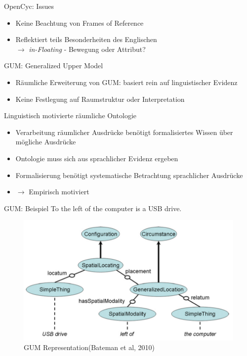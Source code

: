 \documentclass[12pt,a4paper]{beamer}
\begin{document}
\begin{frame}{OpenCyc: Issues}
\begin{itemize}
\item Keine Beachtung von Frames of Reference
\item Reflektiert teils Besonderheiten des Englischen\\
$\to$ \textit{in-Floating} - Bewegung oder Attribut?
\end{itemize}
\end{frame}



\begin{frame}{GUM: Generalized Upper Model}
\begin{itemize}
\item Räumliche Erweiterung von GUM: basiert rein auf linguistischer Evidenz
\item Keine Festlegung auf Raumstruktur oder Interpretation
\end{itemize}
\end{frame}

\begin{frame}{Linguistisch motivierte räumliche Ontologie}
\begin{itemize}
\item Verarbeitung räumlicher Ausdrücke benötigt formalisiertes Wissen über mögliche Ausdrücke
\item Ontologie muss sich aus sprachlicher Evidenz ergeben
\item Formalisierung benötigt systematische Betrachtung sprachlicher Ausdrücke
\item $\to$ Empirisch motiviert
\end{itemize}
\end{frame}



\begin{frame}{GUM: Beispiel}
To the left of the computer is a USB drive.

\begin{figure}
\includegraphics[scale=0.45]{img/2010_fig3.png}
\caption{GUM Representation(Bateman et al, 2010)}
\end{figure}
\end{frame}
\end{document}
